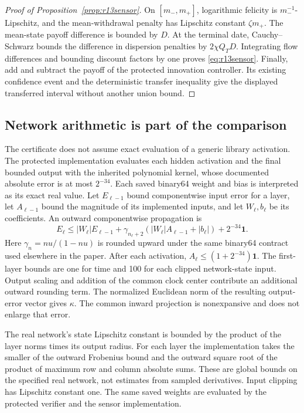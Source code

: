 \begin{proof}[Proof of Proposition~\ref{prop:r13sensor}]
On $[m_-,m_+]$, logarithmic felicity is $m_-^{-1}$-Lipschitz, and the mean-withdrawal penalty has Lipschitz constant $\zeta m_+$. The mean-state payoff difference is bounded by $D$. At the terminal date, Cauchy--Schwarz bounds the difference in dispersion penalties by $2\chi Q_TD$. Integrating flow differences and bounding discount factors by one proves \eqref{eq:r13sensor}. Finally, add and subtract the payoff of the protected innovation controller. Its existing confidence event and the deterministic transfer inequality give the displayed transferred interval without another union bound.
\end{proof}

\subsection{Network arithmetic is part of the comparison}
The certificate does not assume exact evaluation of a generic library activation. The protected implementation evaluates each hidden activation and the final bounded output with the inherited polynomial kernel, whose documented absolute error is at most $2^{-34}$. Each saved binary64 weight and bias is interpreted as its exact real value. Let $E_{\ell-1}$ bound componentwise input error for a layer, let $A_{\ell-1}$ bound the magnitude of its implemented inputs, and let $W_\ell,b_\ell$ be its coefficients. An outward componentwise propagation is
\[
 E_\ell\leq |W_\ell|E_{\ell-1}
       +\gamma_{n_\ell+2}(|W_\ell|A_{\ell-1}+|b_\ell|)
       +2^{-34}\bm1.
\]
Here $\gamma_n=nu/(1-nu)$ is rounded upward under the same binary64 contract used elsewhere in the paper. After each activation, $A_\ell\leq(1+2^{-34})\bm1$. The first-layer bounds are one for time and 100 for each clipped network-state input. Output scaling and addition of the common clock center contribute an additional outward rounding term. The normalized Euclidean norm of the resulting output-error vector gives $\kappa$. The common inward projection is nonexpansive and does not enlarge that error.

The real network's state Lipschitz constant is bounded by the product of the layer norms times its output radius. For each layer the implementation takes the smaller of the outward Frobenius bound and the outward square root of the product of maximum row and column absolute sums. These are global bounds on the specified real network, not estimates from sampled derivatives. Input clipping has Lipschitz constant one. The same saved weights are evaluated by the protected verifier and the sensor implementation.

